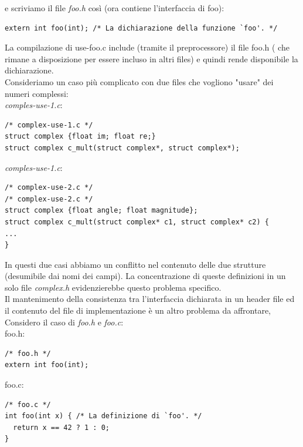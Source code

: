 \documentclass[a4paper,12pt, oneside]{book}
\begin{document}
	e scriviamo il file \textit{foo.h} così (ora contiene l'interfaccia di foo):
	\begin{verbatim}
extern int foo(int); /* La dichiarazione della funzione `foo'. */
\end{verbatim}
	La compilazione di use-foo.c include (tramite il preprocessore) il file
	foo.h ( che rimane a disposizione per essere incluso in altri files) e quindi rende disponibile la dichiarazione.\\
	Consideriamo un caso più complicato con due files che vogliono "usare" dei
	numeri complessi:
	\\
	\textit{comples-use-1.c}:
	\begin{verbatim}
/* complex-use-1.c */
struct complex {float im; float re;}
struct complex c_mult(struct complex*, struct complex*);
\end{verbatim}
	\textit{comples-use-1.c}:
	\begin{verbatim}
/* complex-use-2.c */
/* complex-use-2.c */
struct complex {float angle; float magnitude};
struct complex c_mult(struct complex* c1, struct complex* c2) {
...
}
\end{verbatim}
	In questi due casi abbiamo un conflitto nel contenuto delle due strutture (desumibile dai nomi dei campi). La concentrazione di queste definizioni in un solo file \textit{complex.h }evidenzierebbe questo problema specifico.\\
	Il mantenimento della consistenza tra l'interfaccia dichiarata in un header file ed il
	contenuto del file di implementazione è un altro problema da affrontare, Considero il caso di \textit{foo.h} e \textit{foo.c}:\\
	foo.h:
	\begin{verbatim}
/* foo.h */
extern int foo(int);
\end{verbatim}
	foo.c:
	\begin{verbatim}
/* foo.c */
int foo(int x) { /* La definizione di `foo'. */
  return x == 42 ? 1 : 0;
}
\end{verbatim}
\end{document}
